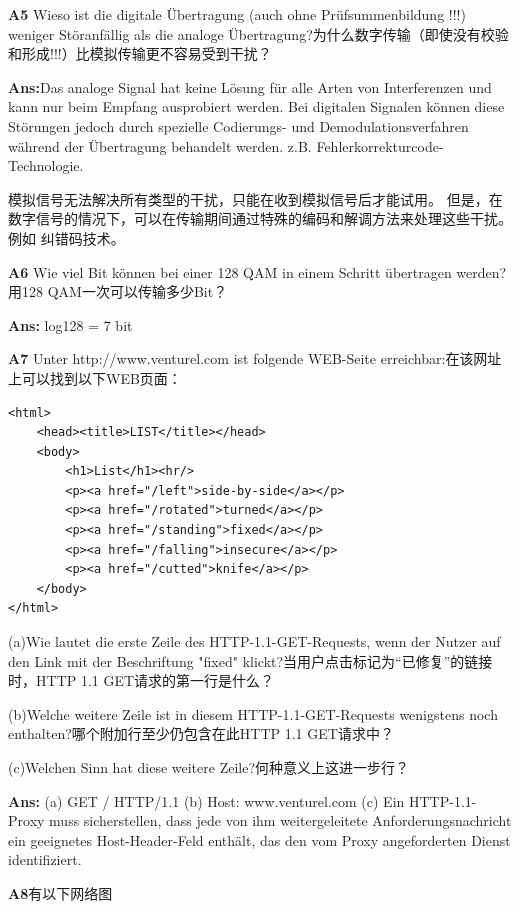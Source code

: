 \documentclass[fleqn]{article}
\begin{document}
\noindent\textbf{A5} Wieso ist die digitale Übertragung (auch ohne Prüfsummenbildung !!!) weniger Störanfällig als die analoge Übertragung?为什么数字传输（即使没有校验和形成!!!）比模拟传输更不容易受到干扰？

\textbf{Ans:}Das analoge Signal hat keine Lösung für alle Arten von Interferenzen und kann nur beim Empfang ausprobiert werden.
Bei digitalen Signalen können diese Störungen jedoch durch spezielle Codierungs- und Demodulationsverfahren während der Übertragung behandelt werden.
z.B. Fehlerkorrekturcode-Technologie.

模拟信号无法解决所有类型的干扰，只能在收到模拟信号后才能试用。
但是，在数字信号的情况下，可以在传输期间通过特殊的编码和解调方法来处理这些干扰。
例如 纠错码技术。

\noindent\textbf{A6} Wie viel Bit können bei einer 128 QAM in einem Schritt übertragen werden?用128 QAM一次可以传输多少Bit？

\textbf{Ans:}  log128 = 7 bit

\noindent\textbf{A7} Unter http://www.venturel.com ist folgende WEB-Seite erreichbar:在该网址上可以找到以下WEB页面：

\begin{lstlisting}
<html>
    <head><title>LIST</title></head>
    <body>
        <h1>List</h1><hr/>
        <p><a href="/left">side-by-side</a></p> 
        <p><a href="/rotated">turned</a></p> 
        <p><a href="/standing">fixed</a></p> 
        <p><a href="/falling">insecure</a></p> 
        <p><a href="/cutted">knife</a></p>
    </body>
</html>
\end{lstlisting}

(a)Wie lautet die erste Zeile des HTTP-1.1-GET-Requests, wenn der Nutzer auf den Link mit der Beschriftung "fixed" klickt?当用户点击标记为“已修复”的链接时，HTTP 1.1 GET请求的第一行是什么？

(b)Welche weitere Zeile ist in diesem HTTP-1.1-GET-Requests wenigstens noch enthalten?哪个附加行至少仍包含在此HTTP 1.1 GET请求中？

(c)Welchen Sinn hat diese weitere Zeile?何种意义上这进一步行？

\textbf{Ans:} (a) GET / HTTP/1.1 \qquad (b) Host: www.venturel.com \qquad (c) Ein HTTP-1.1-Proxy muss sicherstellen, dass jede von ihm weitergeleitete Anforderungsnachricht ein geeignetes Host-Header-Feld enthält, das den vom Proxy angeforderten Dienst identifiziert.

\noindent\textbf{A8}有以下网络图
\end{document}
